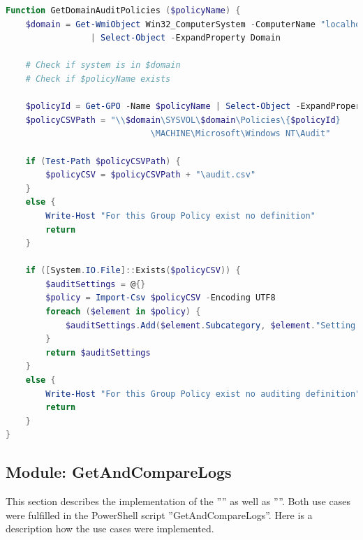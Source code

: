 \begin{lstlisting}[caption=Function GetDomainAuditPolicies, language=PowerShell]
Function GetDomainAuditPolicies ($policyName) {
    $domain = Get-WmiObject Win32_ComputerSystem -ComputerName "localhost" 
                 | Select-Object -ExpandProperty Domain

    # Check if system is in $domain
    # Check if $policyName exists

    $policyId = Get-GPO -Name $policyName | Select-Object -ExpandProperty id
    $policyCSVPath = "\\$domain\SYSVOL\$domain\Policies\{$policyId}
                             \MACHINE\Microsoft\Windows NT\Audit"

    if (Test-Path $policyCSVPath) {
        $policyCSV = $policyCSVPath + "\audit.csv"
    }
    else {
        Write-Host "For this Group Policy exist no definition"
        return
    }

    if ([System.IO.File]::Exists($policyCSV)) {
        $auditSettings = @{}
        $policy = Import-Csv $policyCSV -Encoding UTF8
        foreach ($element in $policy) {
            $auditSettings.Add($element.Subcategory, $element."Setting Value")
        }
        return $auditSettings
    }
    else {
        Write-Host "For this Group Policy exist no auditing definition" 
        return
    }
}
\end{lstlisting}

\clearpage

\subsection{Module: GetAndCompareLogs}
This section describes the implementation of the '''' as well as ''''. Both use cases were fulfilled in the PowerShell script ''GetAndCompareLogs''. Here is a description how the use cases were implemented.

